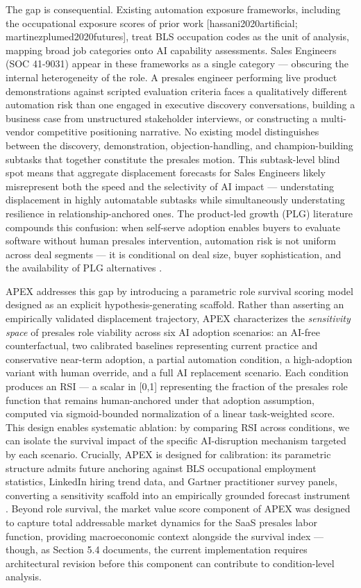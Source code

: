 \documentclass[10pt, conference]{IEEEtran}
\begin{document}
The gap is consequential. Existing automation exposure frameworks, including the occupational exposure scores of prior work [hassani2020artificial; martinezplumed2020futures], treat BLS occupation codes as the unit of analysis, mapping broad job categories onto AI capability assessments. Sales Engineers (SOC 41-9031) appear in these frameworks as a single category --- obscuring the internal heterogeneity of the role. A presales engineer performing live product demonstrations against scripted evaluation criteria faces a qualitatively different automation risk than one engaged in executive discovery conversations, building a business case from unstructured stakeholder interviews, or constructing a multi-vendor competitive positioning narrative. No existing model distinguishes between the discovery, demonstration, objection-handling, and champion-building subtasks that together constitute the presales motion. This subtask-level blind spot means that aggregate displacement forecasts for Sales Engineers likely misrepresent both the speed and the selectivity of AI impact --- understating displacement in highly automatable subtasks while simultaneously understating resilience in relationship-anchored ones. The product-led growth (PLG) literature compounds this confusion: when self-serve adoption enables buyers to evaluate software without human presales intervention, automation risk is not uniform across deal segments --- it is conditional on deal size, buyer sophistication, and the availability of PLG alternatives \cite{davis2021varieties}.

APEX addresses this gap by introducing a parametric role survival scoring model designed as an explicit hypothesis-generating scaffold. Rather than asserting an empirically validated displacement trajectory, APEX characterizes the \textit{sensitivity space} of presales role viability across six AI adoption scenarios: an AI-free counterfactual, two calibrated baselines representing current practice and conservative near-term adoption, a partial automation condition, a high-adoption variant with human override, and a full AI replacement scenario. Each condition produces an RSI --- a scalar in [0,1] representing the fraction of the presales role function that remains human-anchored under that adoption assumption, computed via sigmoid-bounded normalization of a linear task-weighted score. This design enables systematic ablation: by comparing RSI across conditions, we can isolate the survival impact of the specific AI-disruption mechanism targeted by each scenario. Crucially, APEX is designed for calibration: its parametric structure admits future anchoring against BLS occupational employment statistics, LinkedIn hiring trend data, and Gartner practitioner survey panels, converting a sensitivity scaffold into an empirically grounded forecast instrument \cite{wiser2021expert}. Beyond role survival, the market value score component of APEX was designed to capture total addressable market dynamics for the SaaS presales labor function, providing macroeconomic context alongside the survival index --- though, as Section 5.4 documents, the current implementation requires architectural revision before this component can contribute to condition-level analysis.
\end{document}
